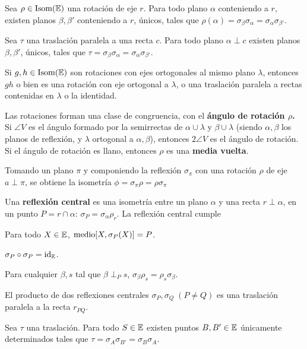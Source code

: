 \begin{itemizex}
	\item Sea $\rho \in \text{Isom}{(\mathbb{E})}$ una rotación de eje $r$. Para todo plano $\alpha$ conteniendo a $r$, existen planos $\beta, \beta'$ conteniendo a $r$, únicos, tales que $\rho(\alpha) = \sigma_\beta\sigma_\alpha = \sigma_\alpha\sigma_{\beta'}$.
	\item Sea $\tau$ una traslación paralela a una recta $c$. Para todo plano $\alpha \perp c$ existen planos $\beta, \beta'$, únicos, tales que $\tau =\sigma_\beta\sigma_\alpha = \sigma_\alpha\sigma_{\beta'}$.
\end{itemizex}

 Si $g,h\in\text{Isom}{(\mathbb{E})}$ son rotaciones con ejes ortogonales al mismo plano $\lambda$, entonces $gh$ o bien es una rotación con eje ortogonal a $\lambda$, o una traslación paralela a rectas contenidas en $\lambda$ o la identidad.

 Las rotaciones forman una clase de congruencia, con el \textbf{ángulo de rotación $\rho$.} Si $\angle V$ es el ángulo formado por la semirrectas de $\alpha \cup \lambda$ y $\beta \cup\lambda$ (siendo $\alpha, \beta$ los planos de reflexión, y $\lambda$ ortogonal a $\alpha, \beta$), entonces $2\angle V$ es el ángulo de rotación. Si el ángulo de rotación es llano, entonces $\rho$ es una \textbf{media vuelta}.

 Tomando un plano $\pi$ y componiendo la reflexión $\sigma_\pi$ con una rotación $\rho$ de eje $a \perp \pi$, se obtiene la isometría $\phi = \sigma_\pi \rho = \rho\sigma_\pi$


 Una \textbf{reflexión central} es una isometría entre un plano $\alpha$ y una recta $r\perp \alpha$, en un punto $P = r \cap \alpha$:  $\sigma_P= \sigma_\alpha \rho_r$. 
La reflexión central cumple 
\begin{itemizex}
	\item Para todo $X \in\mathbb{E}$, $\text{medio}[X, \sigma_P(X)] = P$.
	\item $\sigma_P \circ \sigma_P= \text{id}_{\mathbb{E}}$.
	\item Para cualquier $\beta, s$ tal que $\beta\perp_P s$, $\sigma_\beta\rho_s = \rho_s\sigma_\beta$.
\end{itemizex}

 \begin{itemizex}
	\item El producto de dos reflexiones centrales $\sigma_P, \sigma_Q \; (P\neq Q)$ es una traslación paralela a la recta $r_{PQ}$.
	\item Sea $\tau$ una traslación. Para todo $S \in \mathbb{E}$ existen puntos $B, B' \in \mathbb{E}$ únicamente determinados tales que $\tau = \sigma_A\sigma_{B'} = \sigma_B\sigma_A$.
\end{itemizex}


